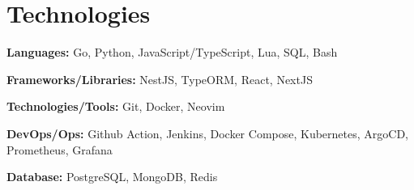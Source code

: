 \section{Technologies}

\begin{onecolentry}
	\textbf{Languages:}
	Go,
	Python,
	JavaScript/TypeScript,
	Lua,
	SQL,
	Bash
\end{onecolentry}

\vspace{0.2 cm}

\begin{onecolentry}
	\textbf{Frameworks/Libraries:}
	NestJS,
	TypeORM,
	React,
	NextJS
\end{onecolentry}

\vspace{0.2 cm}

\begin{onecolentry}
	\textbf{Technologies/Tools:}
	Git,
	Docker,
	Neovim
\end{onecolentry}

\vspace{0.2 cm}

\begin{onecolentry}
	\textbf{DevOps/Ops:}
	Github Action,
	Jenkins,
	Docker Compose,
	Kubernetes,
	ArgoCD,
	Prometheus,
	Grafana
\end{onecolentry}

%
%
%

\vspace{0.2 cm}

\begin{onecolentry}
	\textbf{Database:}
	PostgreSQL,
	MongoDB,
	Redis
\end{onecolentry}
